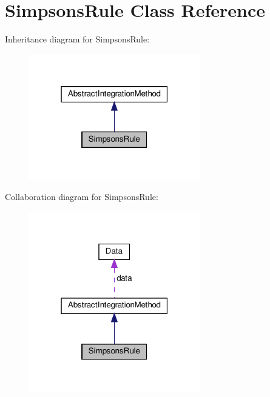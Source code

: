 \hypertarget{class_simpsons_rule}{}\section{Simpsons\+Rule Class Reference}
\label{class_simpsons_rule}


Inheritance diagram for Simpsons\+Rule\+:\nopagebreak
\begin{figure}[H]
\begin{center}
\leavevmode
\includegraphics[width=211pt]{class_simpsons_rule__inherit__graph}
\end{center}
\end{figure}


Collaboration diagram for Simpsons\+Rule\+:\nopagebreak
\begin{figure}[H]
\begin{center}
\leavevmode
\includegraphics[width=211pt]{class_simpsons_rule__coll__graph}
\end{center}
\end{figure}
